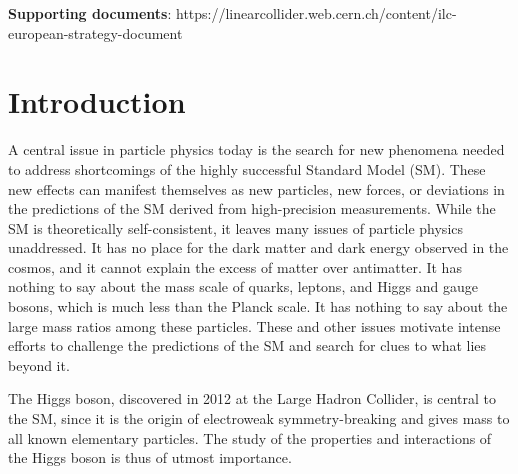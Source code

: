 \documentclass[%
 reprint,
 amsmath,amssymb,
 aps,
]{revtex4-1}
\newcommand{\todo}[1]{\textcolor{red}{{#1}}}
\begin{document}
\maketitle
\onecolumngrid
\textbf{Supporting documents}: https://linearcollider.web.cern.ch/content/ilc-european-strategy-document
\vspace{1cm}

\pagebreak

\pagestyle{plain}
\setcounter{page}{1}

\twocolumngrid



\vspace{-.4cm}

\section{\label{sec:intro}Introduction}

\vspace{-.3cm}


A central issue in particle physics today is the search for new
 phenomena needed to address shortcomings of the 
highly successful Standard Model (SM).  These new effects can manifest
themselves as new particles, new forces, 
 or deviations in the predictions of the SM derived from
 high-precision measurements. While the SM is theoretically
 self-consistent,
it leaves many issues of particle physics unaddressed. 
It has no place for the dark matter and dark energy observed in the
cosmos,
and it cannot explain the excess of matter over antimatter.   It has
nothing to say about the mass scale of quarks, leptons, and Higgs and gauge 
bosons, which is much less than the Planck scale.   It has nothing 
to say about the large mass ratios among these particles.   These and 
other issues motivate intense efforts to challenge the predictions of
the SM and search for clues to what lies beyond it.
 
The Higgs boson,
 discovered in 2012 at the Large Hadron Collider, is
central to the SM,  since it is the  origin of 
 electroweak symmetry-breaking and gives mass to all 
known elementary particles.   The study of the properties and
interactions of the Higgs boson is thus of utmost importance.
\end{document}
